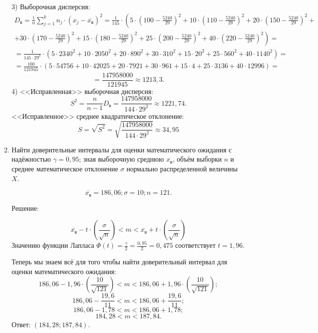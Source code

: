 \documentclass{article}
\begin{document}
\begin{enumerate}
3) Выборочная дисперсия:
\begin{multline*}
D_{\textit{в}}=\frac{1}{n}\sum_{j=1}^k n_j
\cdot\left(x_j-\overline{x_\textit{в}}\right)^2=
\frac{1}{145}\cdot\left(5\cdot\left(100-\frac{5240}{29}\right)^2+10\cdot\left(110-\frac{5240}{29}\right)^2+20\cdot\left(150-\frac{5240}{29}\right)^2+\right.\\
+\left.30\cdot\left(170-\frac{5240}{29}\right)^2+15\cdot\left(180-\frac{5240}{29}\right)^2+25\cdot\left(200-\frac{5240}{29}\right)^2+40\cdot\left(220-\frac{5240}{29}\right)^2\right)=\\
=\frac{1}{145\cdot29^2}\cdot\left(5\cdot2340^2+10\cdot2050^2+20\cdot890^2+30\cdot310^2+15\cdot20^2+25\cdot560^2+40\cdot1140^2\right)=\\
=\frac{100}{121945}\cdot\left(5\cdot54756+10\cdot42025+20\cdot7921+30\cdot961+15\cdot4+25\cdot3136+40\cdot12996\right)=
\end{multline*}
$$=\frac{147958000}{121945}\approx1213,3.$$
4) <<Исправленная>> выборочная дисперсия:
$$S^2=\frac{n}{n-1}D_{\textit{в}}=\frac{147958000}{144\cdot29^2}\approx1221,74.$$
<<Исправленное>> среднее квадратическое отклонение:
$$S=\sqrt{S^2}=\sqrt{\frac{147958000}{144\cdot29^2}}\approx34,95$$

\item %
Найти доверительные интервалы для оценки математического ожидания с надёжностью $\gamma=0,95$; зная выборочную среднюю $\overline{x_\textit{в}}$, объём выборки $n$ и среднее математическое отклонение $\sigma$ нормально распределенной величины $X$.

$$\overline{x_\textit{в}}=186,06; \sigma=10; n=121.$$
\begin{center}Решение:\end{center}
$$\overline{x_\textit{в}}-t\cdot\left(\frac{\sigma}{\sqrt{n}}\right)<m<\overline{x_\textit{в}}+t\cdot\left(\frac{\sigma}{\sqrt{n}}\right)$$
Значению функции Лапласа $\Phi(t)=\frac{\gamma}{2}=\frac{0,95}{2}=0,475$ соответствует $t=1,96$.

Теперь мы знаем всё для того чтобы найти доверительный интервал для оценки математического ожидания:
$$186,06-1,96\cdot\left(\frac{10}{\sqrt{121}}\right)<m<186,06+1,96\cdot\left(\frac{10}{\sqrt{121}}\right);$$
$$186,06-\frac{19,6}{11}<m<186,06+\frac{19,6}{11};$$
$$186,06-1,78<m<186,06+1,78;$$
$$184,28<m<187,84.$$
Ответ: $(184,28;187,84)$.

\end{enumerate}
\end{document}
